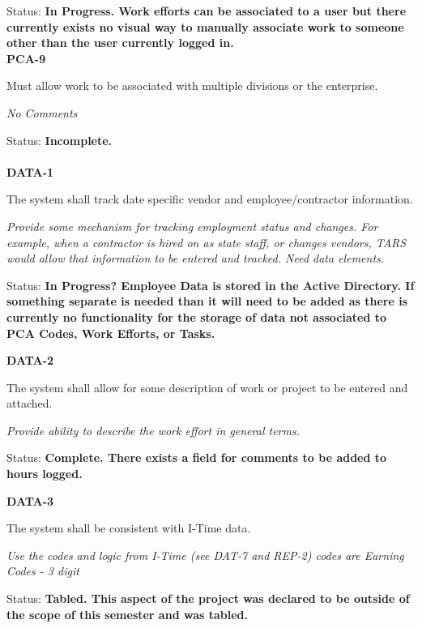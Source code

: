 \noindent Status: \textbf{In Progress.   Work efforts can be associated to a user but there currently exists no visual way to manually associate work to someone other than the user currently logged in.}\\



\noindent \textbf{PCA-9}

\noindent Must allow work to be associated with multiple divisions or the enterprise.

\textit{No Comments}

 Status: \textbf{Incomplete.}\\
\\
\noindent \textbf{DATA-1}

\noindent The system shall track date specific vendor and employee/contractor information.

\noindent \textit{Provide some mechanism for tracking employment status and changes. For example, when a contractor is hired on as state staff, or changes vendors, TARS would allow that information to be entered and tracked. Need data elements.}

\noindent Status: \textbf{In Progress?  Employee Data is stored in the Active Directory.  If something separate is needed than it will need to be added as there is currently no functionality for the storage of data not associated to PCA Codes, Work Efforts, or Tasks.}\textit{}

\noindent \textit{}

\noindent \textbf{DATA-2}

\noindent The system shall allow for some description of work or project to be entered and attached.

\textit{Provide ability to describe the work effort in general terms.}

Status: \textbf{Complete.  There exists a field for comments to be added to hours logged.}\textit{}\\

\noindent 

\noindent \textbf{DATA-3}

\noindent The system shall be consistent with I-Time data.

\noindent \textit{Use the codes and logic from I-Time (see DAT-7 and REP-2) codes are Earning Codes - 3 digit}

\noindent Status: \textbf{Tabled.  This aspect of the project was declared to be outside of the scope of this semester and was tabled.}\textit{}\\

